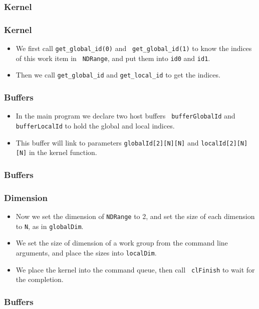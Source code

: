 \documentclass{beamer}
\begin{document}
\begin{frame}
  \frametitle{Kernel}
\end{frame}

\begin{frame}
  \frametitle{Kernel}
  \begin{itemize}
  \item We first call {\tt get\_global\_id(0)} and {\tt
    get\_global\_id(1)} to know the indices of this work item in {\tt
    NDRange}, and put them into {\tt id0} and {\tt id1}.
  \item Then we call {\tt get\_global\_id} and {\tt get\_local\_id} to
    get the indices.
  \end{itemize}
\end{frame}

\begin{frame}
  \frametitle{Buffers}
  \begin{itemize}
    \item In the main program we declare two host buffers {\tt
      bufferGlobalId} and {\tt bufferLocalId} to hold the global and
      local indices.
    \item This buffer will link to parameters {\tt globalId[2][N][N]}
      and {\tt localId[2][N][N]} in the kernel function.
  \end{itemize}
\end{frame}

\begin{frame}
  \frametitle{Buffers}
\end{frame}

\begin{frame}
  \frametitle{Dimension}
  \begin{itemize}
    \item Now we set the dimension of {\tt NDRange} to 2, and set the
      size of each dimension to {\tt N}, as in {\tt globalDim}.
    \item We set the size of dimension of a work group from the
      command line arguments, and place the sizes into {\tt localDim}.
    \item We place the kernel into the command queue, then call {\tt
      clFinish} to wait for the completion.
  \end{itemize}
\end{frame}

\begin{frame}
  \frametitle{Buffers}
\end{frame}
\end{document}
